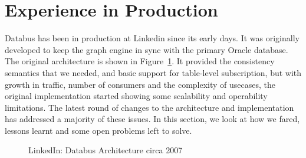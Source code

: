 \section{Experience in Production}
Databus has been in production at Linkedin since its early days. It was originally developed to keep the graph engine in sync with the primary Oracle database.  
The original architecture is shown in Figure~\ref{fig:databus-v1-arch}. It provided the consistency semantics that we needed, and basic support for table-level subscription, but with growth in traffic, number of consumers and the complexity of usecases, the original implementation started showing some scalability and operability limitations. The latest round of changes to the architecture and implementation has addressed a majority of these issues. In this section, we look at how we fared, lessons learnt and some open problems left to solve. 

\begin{figure}
\centering
{}
\caption{LinkedIn: Databus Architecture circa 2007}
\label{fig:databus-v1-arch}
\end{figure}

